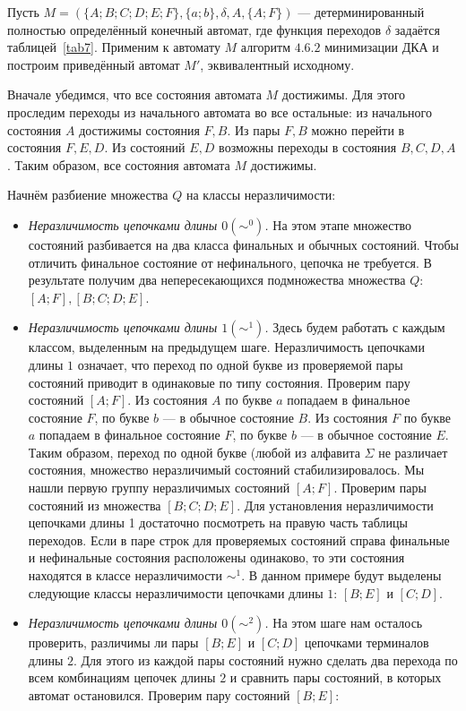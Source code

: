 \begin{myexample}
Пусть $M=(\{A;B;C;D;E;F\},\{a;b\},\delta,A,\{A;F\})$ --- детерминированный полностью определённый конечный автомат, где функция переходов $\delta$ задаётся таблицей~\ref{tab7}. Применим к автомату $M$ алгоритм $4.6.2$ минимизации ДКА и построим приведённый автомат $M'$, эквивалентный исходному.

Вначале убедимся, что все состояния автомата $M$ достижимы. Для этого проследим переходы из начального автомата во все остальные: из начального состояния $A$ достижимы состояния $F, B$. Из пары $F, B$ можно перейти в состояния $F, E, D$. Из состояний $E, D$ возможны переходы в состояния $B, C, D, A$. Таким образом, все состояния автомата $M$ достижимы.

Начнём разбиение множества $Q$ на классы неразличимости:
\begin{itemize}
\item \textit{Неразличимость цепочками длины $0 (\sim^0)$.} На этом этапе множество состояний разбивается на два класса финальных и обычных состояний. Чтобы отличить финальное состояние от нефинального, цепочка не требуется. В результате получим два непересекающихся подмножества множества $Q$: $[A;F], [B;C;D;E]$.
\item \textit{Неразличимость цепочками длины $1 (\sim^1)$.} Здесь будем работать с каждым классом, выделенным на предыдущем шаге. Неразличимость цепочками длины $1$ означает, что переход по одной букве из проверяемой пары состояний приводит в одинаковые по типу состояния. Проверим пару состояний $[A;F]$. Из состояния $A$ по букве $a$ попадаем в финальное состояние $F$, по букве $b$ --- в обычное состояние $B$. Из состояния $F$ по букве $a$ попадаем в финальное состояние $F$, по букве $b$ --- в обычное состояние $E$. Таким образом, переход по одной букве (любой из алфавита $\Sigma$ не различает состояния, множество неразличимый состояний стабилизировалось. Мы нашли первую группу неразличимых состояний $[A;F]$. Проверим пары состояний из множества $[B;C;D;E]$. Для установления неразличимости цепочками длины 1 достаточно посмотреть на правую часть таблицы переходов. Если в паре строк для проверяемых состояний справа финальные и нефинальные состояния расположены одинаково, то эти состояния находятся в классе неразличимости $\sim^1$. В данном примере будут выделены следующие классы неразличимости цепочками длины $1$: $[B;E]$ и $[C;D]$.
\item \textit{Неразличимость цепочками длины $0 (\sim^2)$.} На этом шаге нам осталось проверить, различимы ли пары  $[B;E]$ и $[C;D]$ цепочками терминалов длины $2$. Для этого из каждой пары состояний нужно сделать два перехода по всем комбинациям цепочек длины $2$ и сравнить пары состояний, в которых автомат остановился. Проверим пару состояний  $[B;E]$:

\end{itemize}
\end{myexample}
